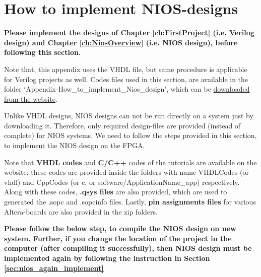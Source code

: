 \chapter{How to implement NIOS-designs}\label{NiosQuartusModelsim}

\graphicspath{{BackMatters/Appendix/NiosOverview/}}

\textbf{Please implement the designs of Chapter \ref{ch:FirstProject} (i.e. Verilog design) and Chapter \ref{ch:NiosOverview} (i.e. NIOS design), before following this section.}

\begin{noNumBox}
	Note that, this appendix uses the VHDL file, but same procedure is applicable for Verilog projects as well. Codes files used in this section, are available in the folder `Appendix-How\_to\_implement\_Nios\_design', which can be \href{http://pythondsp.readthedocs.io/en/latest/pythondsp/toc.html}{downloaded from the website}. 
\end{noNumBox}

Unlike VHDL designs, NIOS designs can not be run directly on a system just by downloading it. Therefore, only required design-files are provided (instead of complete) for NIOS systems. We need to follow the steps provided in this section, to implement the NIOS design on the FPGA. 


Note that \textbf{VHDL codes} and \textbf{C/C++} codes of the tutorials are available on the website; these codes are provided inside the folders with name VHDLCodes (or vhdl) and CppCodes (or c, or software/ApplicationName\_app) respectively. Along with these codes, \textbf{.qsys files} are also provided, which are used to generated the .sopc and .sopcinfo files. Lastly, \textbf{pin assignments files} for various Altera-boards are also provided in the zip folders. 

\textbf{Please follow the below step, to compile the NIOS design on new system. Further, if you change the location of the project in the computer (after compiling it successfully), then NIOS design must be implemented again by following the instruction in Section \ref{sec:nios_again_implement}}



